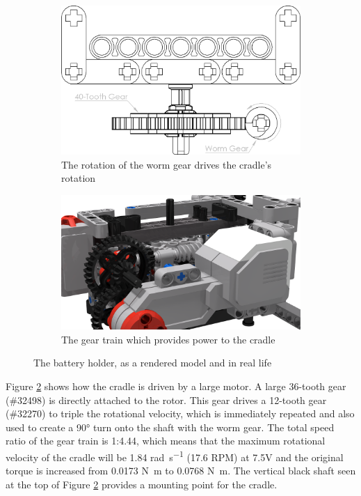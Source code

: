 \documentclass{report}
\newcommand{\legopiece}[1]{(\##1)}
\begin{document}
	\begin{figure}[H]
		\centering
		\begin{subfigure}[b]{0.37999\textwidth}
			\includegraphics[width=\textwidth]{Resources/Images/dwgCradleWormGear.png}
			\caption{The rotation of the worm gear drives the cradle's rotation}
			\label{fig:dwgCradleWormGear}
		\end{subfigure}
		\hspace{10mm}
		\begin{subfigure}[b]{0.42014\textwidth}
			\includegraphics[width=\textwidth]{Resources/Images/rdrCradleWormGear.png}
			\caption{The gear train which provides power to the cradle}
			\label{fig:rdrCradleWormGear}
		\end{subfigure}
		\caption{The battery holder, as a rendered model and in real life}
		\label{fig:cradleWormGear}
	\end{figure}
	
	Figure \ref{fig:rdrCradleWormGear} shows how the cradle is driven by a large motor. A large 36-tooth gear \legopiece{32498} is directly attached to the rotor. This gear drives a 12-tooth gear \legopiece{32270} to triple the rotational velocity, which is immediately repeated and also used to create a \ang{90} turn onto the shaft with the worm gear. The total speed ratio of the gear train is 1:4.44, which means that the maximum rotational velocity of the cradle will be 1.84 \si{\radian\per\second} (17.6 RPM) at 7.5\si{\volt} and the original torque is increased from 0.0173 \si{\newton\metre} to 0.0768 \si{\newton\metre}. The vertical black shaft seen at the top of Figure \ref{fig:rdrCradleWormGear} provides a mounting point for the cradle.
	
\end{document}
